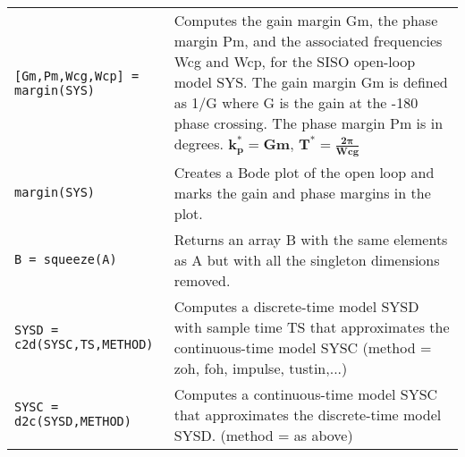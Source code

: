 \begin{center}
\begin{tabular}{p{5cm}|p{8cm}}
        \texttt{[Gm,Pm,Wcg,Wcp] = margin(SYS)}  & Computes the gain margin Gm, the phase margin Pm, and the associated frequencies Wcg and Wcp, for the SISO open-loop model SYS. The gain margin Gm is defined as 1/G where G is the gain at the -180 phase crossing. The phase margin Pm is in degrees. $\mathbf{k_p^* = Gm, \, T^* = \frac{2\pi}{Wcg}}$\\
        
        \texttt{margin(SYS)} & Creates a Bode plot of the open loop and marks the gain and phase margins in the plot. \\
        
        \texttt{B = squeeze(A)}  &  Returns an array B with the same elements as A but with all the singleton dimensions removed.\\
        
        \texttt{SYSD = c2d(SYSC,TS,METHOD)}  &  Computes a discrete-time model SYSD with sample time TS that approximates the continuous-time model SYSC (method = zoh, foh, impulse, tustin,...)\\
        
        \texttt{SYSC = d2c(SYSD,METHOD)} & Computes a continuous-time model SYSC that approximates the discrete-time model SYSD. (method = as above)
    \end{tabular}
\end{center}


\newpage
